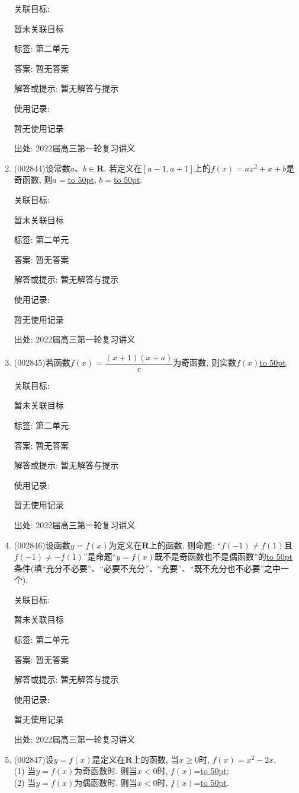 \documentclass[10pt,a4paper]{article}
\newcommand{\blank}[1]{\underline{\hbox to #1pt{}}}
\begin{document}
\begin{enumerate}[1.]
关联目标:

暂未关联目标



标签: 第二单元

答案: 暂无答案

解答或提示: 暂无解答与提示

使用记录:

暂无使用记录


出处: 2022届高三第一轮复习讲义
\item { (002844)}设常数$a$、$b\in \mathbf{R}$. 若定义在$[a-1,a+1]$上的$f(x)=ax^2+x+b$是奇函数, 则$a=$\blank{50}, $b=$\blank{50}.


关联目标:

暂未关联目标



标签: 第二单元

答案: 暂无答案

解答或提示: 暂无解答与提示

使用记录:

暂无使用记录


出处: 2022届高三第一轮复习讲义
\item { (002845)}若函数$f(x)=\dfrac{(x+1)(x+a)}x$为奇函数, 则实数$f(x)$\blank{50}.


关联目标:

暂未关联目标



标签: 第二单元

答案: 暂无答案

解答或提示: 暂无解答与提示

使用记录:

暂无使用记录


出处: 2022届高三第一轮复习讲义
\item { (002846)}设函数$y=f(x)$为定义在$\mathbf{R}$上的函数, 则命题: ``$f(-1)\ne f(1)$且$f(-1)\ne -f(1)$''是命题``$y=f(x)$既不是奇函数也不是偶函数''的\blank{50}条件(填``充分不必要''、``必要不充分''、``充要''、``既不充分也不必要''之中一个).


关联目标:

暂未关联目标



标签: 第二单元

答案: 暂无答案

解答或提示: 暂无解答与提示

使用记录:

暂无使用记录


出处: 2022届高三第一轮复习讲义
\item { (002847)}设$y=f(x)$是定义在$\mathbf{R}$上的函数, 当$x\ge 0$时, $f(x)=x^2-2x$.\\
(1) 当$y=f(x)$为奇函数时, 则当$x<0$时, $f(x)$=\blank{50};\\
(2) 当$y=f(x)$为偶函数时, 则当$x<0$时, $f(x)$=\blank{50}.



\end{enumerate}
\end{document}
